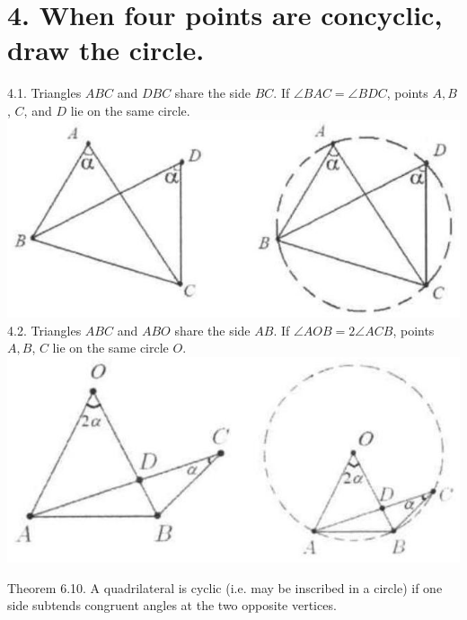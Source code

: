 \documentclass[10pt]{article}
\begin{document}
\section*{4. When four points are concyclic, draw the circle.}
4.1. Triangles \(A B C\) and \(D B C\) share the side \(B C\). If \(\angle B A C=\angle B D C\), points \(A, B\), \(C\), and \(D\) lie on the same circle.\\
\includegraphics[max width=\textwidth, center]{2025_04_17_97bc1f7e44d93c271a88g-191(3)}\\
4.2. Triangles \(A B C\) and \(A B O\) share the side \(A B\). If \(\angle A O B=2 \angle A C B\), points \(A, B\), \(C\) lie on the same circle \(O\).\\
\includegraphics[max width=\textwidth, center]{2025_04_17_97bc1f7e44d93c271a88g-191}

Theorem 6.10. A quadrilateral is cyclic (i.e. may be inscribed in a circle) if one side subtends congruent angles at the two opposite vertices.
\end{document}
